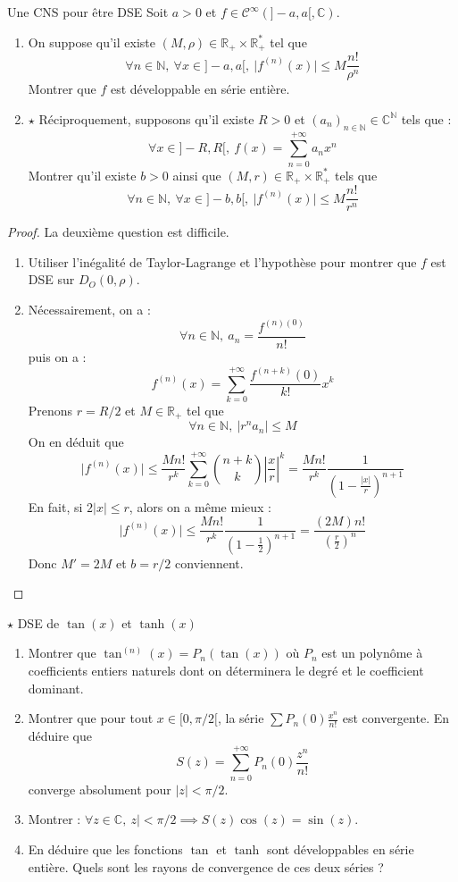 \documentclass[french,a4paper]{article}
\newcommand{\N}{\mathbb{N}}
\newcommand{\R}{\mathbb{R}}
\newcommand{\C}{\mathbb{C}}
\newcommand{\st}{^*}
\theoremstyle{plain}
\theoremstyle{definition}
\theoremstyle{remark}
\begin{document}
\begin{ex}[Moulin.SE.42]{Une CNS pour être DSE}
	Soit $a>0$ et $f\in\mathcal{C}^\infty(]-a,a[,\C)$. 
	\begin{enumerate}
		\item On suppose qu'il existe $(M,\rho)\in\R_+\times\R_+\st$ tel que $$\forall n\in\N,\ \forall x\in]-a,a[,\ \lvert f^{(n)}(x)\rvert\leqslant M\frac{n!}{\rho^n}$$ Montrer que $f$ est développable en série entière.
		\item $\star$ Réciproquement, supposons qu'il existe $R>0$ et $(a_n)_{n\in\N}\in\C^\N$ tels que : $$\forall x\in]-R,R[,\ f(x)=\sum_{n=0}^{+\infty}a_nx^n$$ Montrer qu'il existe $b>0$ ainsi que $(M,r)\in\R_+\times\R_+\st$ tels que $$\forall n\in\N,\ \forall x\in]-b,b[,\ \lvert f^{(n)}(x)\rvert\leqslant M\frac{n!}{r^n}$$
	\end{enumerate}
\end{ex}
\begin{proof}
	La deuxième question est difficile.
	\begin{enumerate}
		\item Utiliser l'inégalité de Taylor-Lagrange et l'hypothèse pour montrer que $f$ est DSE sur $D_O(0,\rho)$.
		\item Nécessairement, on a : $$\forall n\in\N,\ a_n=\frac{f^{(n)(0)}}{n!}$$ puis on a : $$f^{(n)}(x)=\sum_{k=0}^{+\infty}\frac{f^{(n+k)}(0)}{k!}x^k$$ Prenons $r=R/2$ et $M\in\R_+$ tel que $$\forall n\in\N,\ \lvert r^na_n\rvert\leqslant M$$ On en déduit que $$\lvert f^{(n)}(x)\rvert\leqslant\frac{Mn!}{r^k}\sum_{k=0}^{+\infty}\binom{n+k}{k}\left\lvert\frac{x}{r}\right\rvert^k=\frac{Mn!}{r^k}\frac{1}{\left(1-\frac{\lvert x\rvert}{r}\right)^{n+1}}$$ En fait, si $2\lvert x\rvert\leqslant r$, alors on a même mieux : $$\lvert f^{(n)}(x)\rvert\leqslant\frac{Mn!}{r^k}\frac{1}{\left(1-\frac{1}{2}\right)^{n+1}}=\frac{(2M)n!}{\left(\frac{r}{2}\right)^n}$$ Donc $M'=2M$ et $b=r/2$ conviennent.
	\end{enumerate}
\end{proof}

\begin{ex}[Moulin.SE.43]{$\star$ DSE de $\tan(x)$ et $\tanh(x)$}
	\begin{enumerate}
		\item Montrer que $\tan^{(n)}(x)=P_n(\tan(x))$ où $P_n$ est un polynôme à coefficients entiers naturels dont on déterminera le degré et le coefficient dominant.
		\item Montrer que pour tout $x\in[0,\pi/2[$, la série $\displaystyle\sum P_n(0)\frac{x^n}{n!}$ est convergente. En déduire que $$S(z)=\sum_{n=0}^{+\infty}P_n(0)\frac{z^n}{n!}$$ converge absolument pour $\lvert z\rvert<\pi/2$.
		\item Montrer : $\forall z\in\C,\ z\rvert<\pi/2\implies S(z)\cos(z)=\sin(z)$.
		\item En déduire que les fonctions $\tan$ et $\tanh$ sont développables en série entière. Quels sont les rayons de convergence de ces deux séries ?
	\end{enumerate}
\end{ex}
\end{document}
